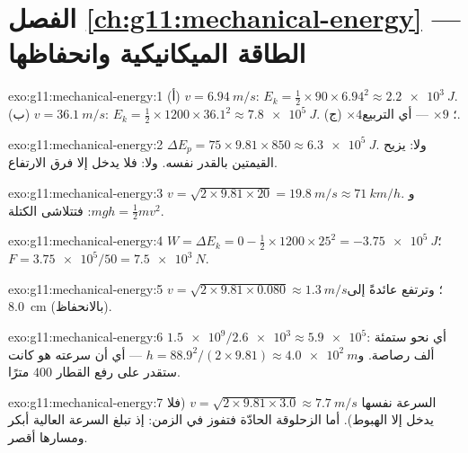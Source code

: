 \section*{الفصل \ref{ch:g11:mechanical-energy} --- الطاقة الميكانيكية وانحفاظها}

\begin{solution}{exo:g11:mechanical-energy:1}
(أ) $v = \qty{6.94}{m/s}$:
$E_k = \tfrac12 \times 90 \times 6.94^2 \approx \qty{2.2e3}{J}$.
(ب) $v = \qty{36.1}{m/s}$:
$E_k = \tfrac12 \times 1200 \times 36.1^2 \approx \qty{7.8e5}{J}$.
(ج) $\times 4$؛ $\times 9$ --- أي التربيع.
\end{solution}

\begin{solution}{exo:g11:mechanical-energy:2}
$\Delta E_p = 75 \times 9.81 \times 850 \approx \qty{6.3e5}{J}$. ولا:
 يزيح القيمتين بالقدر نفسه. ولا: فلا يدخل إلا فرق
الارتفاع.
\end{solution}

\begin{solution}{exo:g11:mechanical-energy:3}
$v = \sqrt{2 \times 9.81 \times 20} = \qty{19.8}{m/s} \approx
\qty{71}{km/h}$. و$mgh = \tfrac12 mv^2$: فتتلاشى الكتلة.
\end{solution}

\begin{solution}{exo:g11:mechanical-energy:4}
$W = \Delta E_k = 0 - \tfrac12 \times 1200 \times 25^2 =
\qty{-3.75e5}{J}$؛ $F = \num{3.75e5}/50 = \qty{7.5e3}{N}$.
\end{solution}

\begin{solution}{exo:g11:mechanical-energy:5}
$v = \sqrt{2 \times 9.81 \times 0.080} \approx \qty{1.3}{m/s}$؛ وترتفع
عائدةً إلى \qty{8.0}{cm} (بالانحفاظ).
\end{solution}

\begin{solution}{exo:g11:mechanical-energy:6}
$\num{1.5e9}/\num{2.6e3} \approx \num{5.9e5}$: أي نحو ستمئة
ألف رصاصة. و$h = 88.9^2/(2 \times 9.81) \approx \qty{4.0e2}{m}$
--- أي أن سرعته هو كانت ستقدر على رفع القطار $400$ مترًا.
\end{solution}

\begin{solution}{exo:g11:mechanical-energy:7}
السرعة نفسها $v = \sqrt{2 \times 9.81 \times 3.0} \approx \qty{7.7}{m/s}$
(فلا يدخل إلا الهبوط). أما الزحلوقة الحادّة فتفوز في الزمن: إذ تبلغ السرعة
العالية أبكر ومسارها أقصر.
\end{solution}

